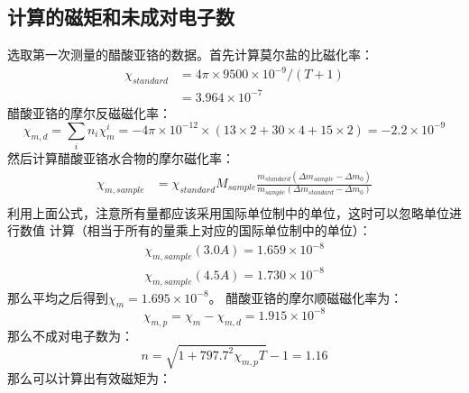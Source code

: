\documentclass[a4paper,zihao=5,UTF8]{ctexart}
\begin{document}
        \subsection{计算的磁矩和未成对电子数}
        选取第一次测量的醋酸亚铬的数据。首先计算莫尔盐的比磁化率：
        \begin{equation}
            \begin{split}
                \chi_{standard} &= 4\pi\times 9500 \times 10^{-9} / (T + 1)\\
                & = 3.964\times 10^{-7}
            \end{split}
        \end{equation}
        醋酸亚铬的摩尔反磁磁化率：
        \begin{equation}
            \chi_{m, d} = \sum_{i}n_i\chi_{m}^{i} = -4\pi\times 10^{-12}×(13×2+30×4+15×2)=-2.2×10^{-9}
        \end{equation}
        然后计算醋酸亚铬水合物的摩尔磁化率：
        \begin{equation}
            \begin{split}
            \chi_{m,sample} &= \chi_{standard}M_{sample}\frac{m_{standard}(\Delta m_{sample} - \Delta m_{0})}
            {m_{sample}(\Delta m_{standard} - \Delta m_{0})}\\
            \end{split}
        \end{equation}
        利用上面公式，注意所有量都应该采用国际单位制中的单位，这时可以忽略单位进行数值
        计算（相当于所有的量乘上对应的国际单位制中的单位）：
        \begin{equation}
            \begin{split}
                \chi_{m, sample}(3.0A) = 1.659\times 10^{-8}\\
                \chi_{m, sample}(4.5A) = 1.730\times 10^{-8}
            \end{split}
        \end{equation}
        那么平均之后得到$\chi_{m} = 1.695\times 10^{-8}$。
        醋酸亚铬的摩尔顺磁磁化率为：
        \begin{equation}
            \chi_{m, p} = \chi_{m} - \chi_{m, d} = 1.915\times10^{-8} 
        \end{equation}
        那么不成对电子数为：
        \begin{equation}
            n = \sqrt{1 + 797.7^2\chi_{m,p}T} - 1 = 1.16
        \end{equation}
        那么可以计算出有效磁矩为：
\end{document}
